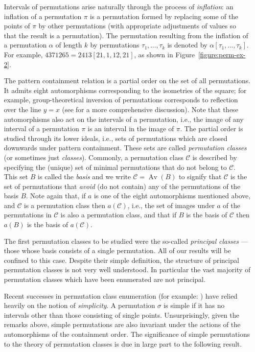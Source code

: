 \documentclass[10pt]{article}
\theoremstyle{plain}
\newcommand{\Av}{\operatorname{Av}}
\newcommand{\C}{\mathcal{C}}
\begin{document}
Intervals of permutations arise naturally through the process of \emph{inflation}: an inflation of a permutation $\pi$ is a permutation formed by replacing some of the points of $\pi$ by other permutations (with appropriate adjustments of values so that the result is a permutation). The permutation resulting from the inflation of a permutation $\alpha$ of length $k$ by permutations $\tau_1, \ldots, \tau_k$ is denoted by $\alpha[\tau_1, \ldots, \tau_k]$. For example, $4371265  = 2413[21, 1, 12, 21]$, as shown in Figure~\ref{figure:perm-ex-2}.

The pattern containment relation is a partial order on the set of all permutations.  It admits eight automorphisms corresponding to the isometries of the square; for example, group-theoretical inversion of permutations corresponds to reflection over the line $y=x$ (see \cite{simion:restricted-permutations} for a more comprehensive discussion).  Note that these automorphisms also act on the intervals of a permutation, i.e., the image of any interval of a permutation $\pi$ is an interval in the image of $\pi$. The partial order is studied through its lower ideals, i.e., sets of permutations which are closed downwards under pattern containment. These sets are called \emph{permutation classes} (or sometimes just \emph{classes}).  Commonly, a permutation class $\C$ is described by specifying the (unique) set of minimal permutations that do not belong to $\C$.  This set $B$ is called the \emph{basis} and we write $\C=\Av(B)$ to signify that $\C$ is the set of permutations that \emph{avoid} (do not contain) any of the permutations of the basis $B$. Note again that, if $a$ is one of the eight automorphisms mentioned above, and $\C$ is a permutation class then $a(\C)$, i.e., the set of images under $a$ of the permutations in $\C$ is also a permutation class, and that if $B$ is the basis of $\C$ then $a(B)$ is the basis of $a(\C)$.

The first permutation classes to be studied were the so-called \emph{principal classes} --- those whose basis consists of a single permutation. All of our results will be confined to this case.  Despite their simple definition, the structure of principal permutation classes is not very well understood.  In particular the vast majority of permutation classes which have been enumerated are not principal.

Recent successes in permutation class enumeration (for example: \cite{atkinson:(3+1)-avoiding, albert:enumeration-2143-4231, albert:enumeration-three-classes-grid, albert:inflations-case-studies, pantone:enumeration-3124-4312, bona:pattern-avoiding-involutions}) have relied heavily on the notion of \emph{simplicity}.  A permutation $\sigma$ is simple if it has no intervals other than those consisting of single points.  Unsurprisingly, given the remarks above, simple permutations are also invariant under the actions of the automorphisms of the containment order. The significance of simple permutations to the theory of permutation classes is due in large part to the following result.
\end{document}

